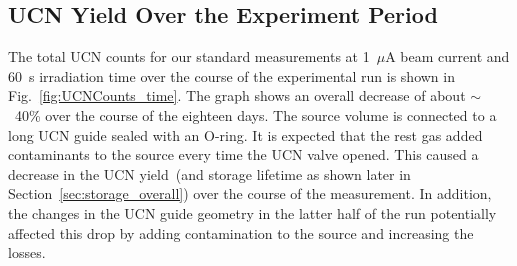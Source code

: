 

\subsection{UCN Yield Over the Experiment Period}

The total UCN counts for our standard measurements at 1~$\mu$A beam
current and 60~s irradiation time over the course of the experimental
run is shown in Fig.~\ref{fig:UCNCounts_time}. The graph shows an
overall decrease of about $\sim$~40\% over the course of the eighteen
days. The source volume is connected to a long UCN guide sealed with
an O-ring. It is expected that the rest gas added contaminants to the
source every time the UCN valve opened. This caused a decrease in the
UCN yield~(and storage lifetime as shown later in
Section~\ref{sec:storage_overall}) over the course of the
measurement. In addition, the changes in the UCN guide geometry in the
latter half of the run potentially affected this drop by adding
contamination to the source and increasing the losses.


